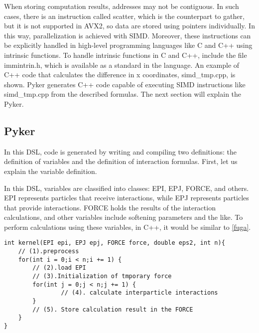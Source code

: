 \documentclass[ams, a4j]{U-AizuGT}
\begin{document}
When storing computation results, addresses may 
not be contiguous. In such cases, there is an instruction called scatter, which is the counterpart to gather, but it is not supported 
in AVX2, so data are stored using pointers individually. In this way, parallelization is achieved with SIMD. Moreover, these instructions
can be explicitly handled in high-level programming languages like C and C++ using intrinsic functions. To handle intrinsic functions 
in C and C++, include the file immintrin.h, which is available as a standard in the language. An example of C++ code that calculates the difference in x coordinates, simd\_tmp.cpp, is shown. { Pyker}  generates C++ code capable of executing SIMD instructions like simd\_tmp.cpp
from the described formulas. The next section will explain the Pyker.

\subsection{Pyker}
In this DSL, code is generated by writing and compiling two definitions: the definition of variables and the definition of interaction formulas. First, let us explain the variable definition.


In this DSL, variables are classified into classes: EPI, EPJ, FORCE, and others. EPI represents particles that receive interactions, 
while EPJ represents particles that provide interactions. FORCE holds the results of the interaction calculations, and other variables 
include softening parameters and the like. To perform calculations using these variables, in C++, it would be similar to \ref{fuga}.


\begin{lstlisting}[frame=single, caption=hoge, label=fuga]
int kernel(EPI epi, EPJ epj, FORCE force, double eps2, int n){
	// (1).preprocess
	for(int i = 0;i < n;i += 1) {
		// (2).load EPI 
		// (3).Initialization of tmporary force
		for(int j = 0;j < n;j += 1) {
				// (4). calculate interparticle interactions
		}
		// (5). Store calculation result in the FORCE
	}
}
\end{lstlisting}
\end{document}
